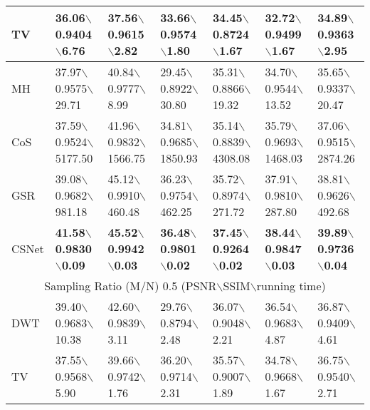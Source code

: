\documentclass[5pt]{article}
\begin{document}
\begin{table*}[t]
\begin{tabular}{|l|l|l|l|l|l|l|}
\hline 
TV & 36.06$\backslash$0.9404$\backslash$6.76 & 37.56$\backslash$0.9615$\backslash$2.82 & 33.66$\backslash$0.9574$\backslash$1.80 & 34.45$\backslash$0.8724$\backslash$1.67 & 32.72$\backslash$0.9499$\backslash$1.67 & 34.89$\backslash$0.9363$\backslash$2.95\\ 
\hline 
MH & 37.97$\backslash$0.9575$\backslash$29.71 & 40.84$\backslash$0.9777$\backslash$8.99 & 29.45$\backslash$0.8922$\backslash$30.80 & 35.31$\backslash$0.8866$\backslash$19.32 & 34.70$\backslash$0.9544$\backslash$13.52 & 35.65$\backslash$0.9337$\backslash$20.47\\ 
\hline 
CoS & 37.59$\backslash$0.9524$\backslash$\tiny 5177.50 & 41.96$\backslash$0.9832$\backslash$\tiny 1566.75 & 34.81$\backslash$0.9685$\backslash$\tiny 1850.93 & 35.14$\backslash$0.8839$\backslash$\tiny 4308.08 & 35.79$\backslash$0.9693$\backslash$\tiny 1468.03 & 37.06$\backslash$0.9515$\backslash$\tiny 2874.26\\ 
\hline 
GSR & 39.08$\backslash$0.9682$\backslash$981.18 & 45.12$\backslash$0.9910$\backslash$460.48 & 36.23$\backslash$0.9754$\backslash$462.25 & 35.72$\backslash$0.8974$\backslash$271.72 & 37.91$\backslash$0.9810$\backslash$287.80 & 38.81$\backslash$0.9626$\backslash$492.68\\ 
\hline 
CSNet & \textbf{41.58}$\backslash$\textbf{0.9830}$\backslash$\textbf{0.09} & \textbf{45.52}$\backslash$\textbf{0.9942}$\backslash$\textbf{0.03} & \textbf{36.48}$\backslash$\textbf{0.9801}$\backslash$\textbf{0.02} & \textbf{37.45}$\backslash$\textbf{0.9264}$\backslash$\textbf{0.02} & \textbf{38.44}$\backslash$\textbf{0.9847}$\backslash$\textbf{0.03} & \textbf{39.89}$\backslash$\textbf{0.9736}$\backslash$\textbf{0.04}\\ 
\hline 
\multicolumn{7}{|c|}{Sampling Ratio (M/N) 0.5 (PSNR$\backslash$SSIM$\backslash$running time)}\\
\hline 
DWT & 39.40$\backslash$0.9683$\backslash$10.38 & 42.60$\backslash$0.9839$\backslash$3.11 & 29.76$\backslash$0.8794$\backslash$2.48 & 36.07$\backslash$0.9048$\backslash$2.21 & 36.54$\backslash$0.9683$\backslash$4.87 & 36.87$\backslash$0.9409$\backslash$4.61\\ 
\hline 
TV & 37.55$\backslash$0.9568$\backslash$5.90 & 39.66$\backslash$0.9742$\backslash$1.76 & 36.20$\backslash$0.9714$\backslash$2.31 & 35.57$\backslash$0.9007$\backslash$1.89 & 34.78$\backslash$0.9668$\backslash$1.67 & 36.75$\backslash$0.9540$\backslash$2.71\\ 

\end{tabular}
\end{table*}
\end{document}
